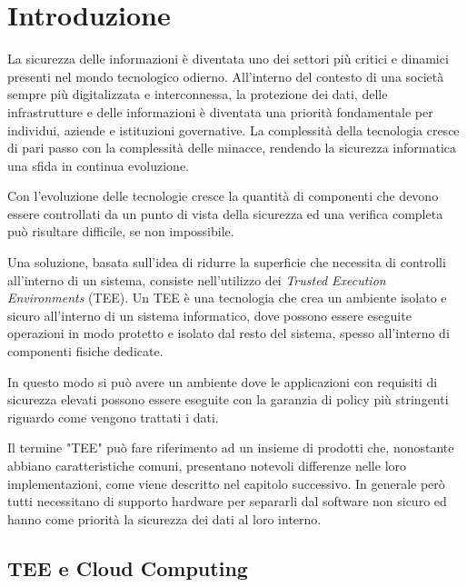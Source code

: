 \documentclass[12pt,italian]{report}
\begin{document}
	
	\frontespizio
	\afterpreface
	
	
	\chapter{Introduzione}
	\label{sec:introduzione}
	La sicurezza delle informazioni è diventata uno dei settori più critici e dinamici presenti nel mondo tecnologico odierno. All'interno del contesto di una società sempre più digitalizzata e interconnessa, la protezione dei dati, delle infrastrutture e delle informazioni è diventata una priorità fondamentale per individui, aziende e istituzioni governative. La complessità della tecnologia cresce di pari passo con la complessità delle minacce, rendendo la sicurezza informatica una sfida in continua evoluzione.
	
	Con l'evoluzione delle tecnologie cresce la quantità di componenti che devono essere controllati da un punto di vista della sicurezza ed una verifica completa può risultare difficile, se non impossibile.
	
	\bigbreak
	
	Una soluzione, basata sull'idea di ridurre la superficie che necessita di controlli all'interno di un sistema, consiste nell'utilizzo dei \textit{Trusted Execution Environments} (TEE). Un TEE è una tecnologia che crea un ambiente isolato e sicuro all'interno di un sistema informatico, dove possono essere eseguite operazioni in modo protetto e isolato dal resto del sistema, spesso all'interno di componenti fisiche dedicate.
	
	In questo modo si può avere un ambiente dove le applicazioni con requisiti di sicurezza elevati possono essere eseguite con la garanzia di policy più stringenti riguardo come vengono trattati i dati.
	
	Il termine "TEE" può fare riferimento ad un insieme di prodotti che, nonostante abbiano caratteristiche comuni, presentano notevoli differenze nelle loro implementazioni, come viene descritto nel capitolo successivo. In generale però tutti necessitano di supporto hardware per separarli dal software non sicuro ed hanno come priorità la sicurezza dei dati al loro interno.
	
	\section{TEE e Cloud Computing}
	\label{sec:tee_intr}
	
\end{document}
